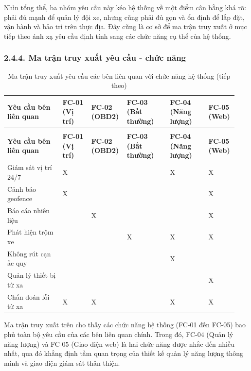\documentclass[a4paper]{extarticle}
\newcommand{\thesissettableid}[2]{%
  \renewcommand{\thetable}{#1}%
  \renewcommand{\theHtable}{#2}%
}
\begin{document}
Nhìn tổng thể, ba nhóm yêu cầu này kéo hệ thống về một điểm cân bằng khá
rõ: phải đủ mạnh để quản lý đội xe, nhưng cũng phải đủ gọn và ổn định để
lắp đặt, vận hành và bảo trì trên thực địa. Đây cũng là cơ sở để ma trận
truy xuất ở mục tiếp theo ánh xạ yêu cầu định tính sang các chức năng cụ
thể của hệ thống.

\subsubsection{2.4.4. Ma trận truy xuất yêu cầu - chức
năng}\label{244-ma-trux1eadn-truy-xuux1ea5t-yuxeau-cux1ea7u---chux1ee9c-nux103ng}


{\thesissettableid{2.6}{tab-ch2-ma-tran-truy-xuat-yeu-cau-cac-ben-lien-quan-voi-chuc}
\def\LTcaptype{table}
\begin{longtable}{|L{0.237\linewidth}|L{0.122\linewidth}|L{0.122\linewidth}|L{0.186\linewidth}|L{0.168\linewidth}|L{0.101\linewidth}|}
\caption{Ma trận truy xuất yêu cầu các bên liên quan với chức năng hệ thống}\label{tab:ch2-ma-tran-truy-xuat-yeu-cau-cac-ben-lien-quan-voi-chuc}\\
\hline \textbf{Yêu cầu bên liên quan} & \textbf{FC-01 (Vị trí)} & \textbf{FC-02 (OBD2)} & \textbf{FC-03 (Bất
thường)} & \textbf{FC-04 (Năng lượng)} & \textbf{FC-05 (Web)} \\
\hline
\endfirsthead
\caption[]{Ma trận truy xuất yêu cầu các bên liên quan với chức năng hệ thống (tiếp theo)}\\
\hline \textbf{Yêu cầu bên liên quan} & \textbf{FC-01 (Vị trí)} & \textbf{FC-02 (OBD2)} & \textbf{FC-03 (Bất
thường)} & \textbf{FC-04 (Năng lượng)} & \textbf{FC-05 (Web)} \\
\hline
\endhead
\hline
\endfoot
\endlastfoot
Giám sát vị trí 24/7 & X & & & X & X \\\hline
Cảnh báo geofence & X & & & & X \\\hline
Báo cáo nhiên liệu & & X & & & X \\\hline
Phát hiện trộm xe & & & X & X & X \\\hline
Không rút cạn ắc quy & & & & X & \\\hline
Quản lý thiết bị từ xa & & & & & X \\\hline
Chẩn đoán lỗi từ xa & X & X & & X & X \\\hline
\end{longtable}
}


Ma trận truy xuất trên cho thấy các chức năng hệ thống (FC-01 đến FC-05)
bao phủ toàn bộ yêu cầu của các bên liên quan chính. Trong đó, FC-04
(Quản lý năng lượng) và FC-05 (Giao diện web) là hai chức năng được nhắc
đến nhiều nhất, qua đó khẳng định tầm quan trọng của thiết kế quản lý
năng lượng thông minh và giao diện giám sát thân thiện.
\end{document}
